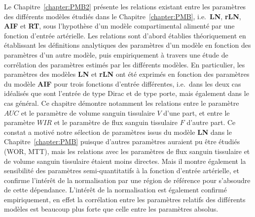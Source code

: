 \begin{otherlanguage}{francais}
Le Chapitre~\ref{chapter:PMB2} pr\'esente les relations existant entre les param\`etres des diff\'erents mod\`eles \'etudi\'es dans le Chapitre~\ref{chapter:PMB}, i.e.~\textbf{LN}, \textbf{rLN}, \textbf{AIF} et \textbf{RT}, sous l'hypoth\`ese d'un mod\`ele compartimental aliment\'e par une fonction d'entr\'ee art\'erielle.
Les relations sont d'abord \'etablies th\'eoriquement en \'etablissant les d\'efinitions analytiques des param\`etres d'un mod\`ele en fonction des param\`etres d'un autre mod\`ele, puis empiriquement \`a travers une \'etude de corr\'elation des param\`etres estim\'es par les diff\'erents mod\`eles.
En particulier, les param\`etres des mod\`eles \textbf{LN} et \textbf{rLN} ont \'et\'e exprim\'es en fonction des param\`etres du mod\`ele \textbf{AIF} pour trois fonctions d'entr\'ee diff\'erentes, i.e.~dans les deux cas id\'ealis\'es que sont l'entr\'ee de type Dirac et de type porte, mais \'egalement dans le cas g\'en\'eral.
Ce chapitre d\'emontre notamment les relations entre le param\`etre $AUC$ et le param\`etre de volume sanguin tissulaire $V$ d'une part, et entre le param\`etre $WIR$ et le param\`etre de flux sanguin tissulaire $F$ d'autre part. 
Ce constat a motiv\'e notre s\'election de param\`etres issus du mod\`ele \textbf{LN} dans le Chapitre~\ref{chapter:PMB} puisque d'autres param\`etres auraient pu \^etre \'etudi\'es (WOR, MTT), mais les relations avec les param\`etres de flux sanguin tissulaire et de volume sanguin tissulaire \'etaient moins directes. 
Mais il montre \'egalement la sensibilit\'e des param\`etres semi-quantitatifs \`a la fonction d'entr\'ee art\'erielle, et confirme l'int\'er\^et de la normalisation par une r\'egion de r\'ef\'erence pour s'absoudre de cette d\'ependance.
L'int\'er\^et de la normalisation est \'egalement confirm\'e empiriquement, en effet la corr\'elation entre les param\`etres relatifs des diff\'erents mod\`eles est beaucoup plus forte que celle entre les param\`etres absolus.


\end{otherlanguage}
